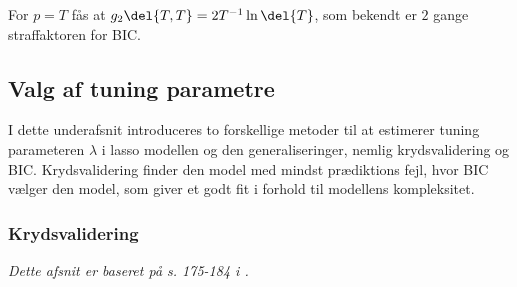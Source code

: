For \(p = T\) fås at \(g_2 \del{T,T} = 2 T^{-1} \ln \del{T}\), som bekendt er \(2\) gange straffaktoren for BIC.

\subsection{Valg af tuning parametre}
I dette underafsnit introduceres to forskellige metoder til at estimerer tuning parameteren \(\lambda\) i lasso modellen og den generaliseringer, nemlig krydsvalidering og BIC. 
Krydsvalidering finder den model med mindst prædiktions fejl, hvor BIC vælger den model, som giver et godt fit i forhold til modellens kompleksitet. 

\subsubsection{Krydsvalidering}
\textit{Dette afsnit er baseret på s. 175-184 i \citep{james}.}



